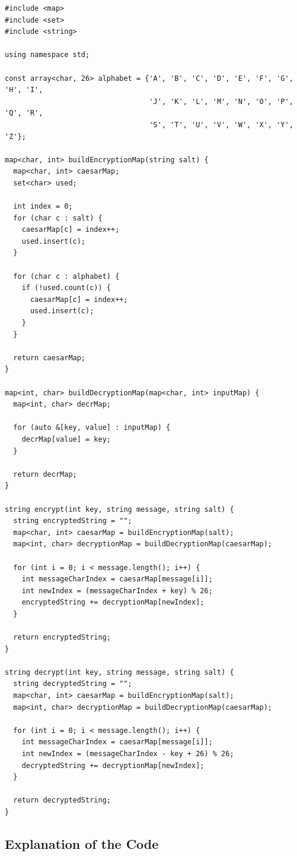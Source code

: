 \documentclass[12pt]{article}
\begin{document}
\begin{verbatim}
#include <map>
#include <set>
#include <string>

using namespace std;

const array<char, 26> alphabet = {'A', 'B', 'C', 'D', 'E', 'F', 'G', 'H', 'I',
                                  'J', 'K', 'L', 'M', 'N', 'O', 'P', 'Q', 'R',
                                  'S', 'T', 'U', 'V', 'W', 'X', 'Y', 'Z'};

map<char, int> buildEncryptionMap(string salt) {
  map<char, int> caesarMap;
  set<char> used;

  int index = 0;
  for (char c : salt) {
    caesarMap[c] = index++;
    used.insert(c);
  }

  for (char c : alphabet) {
    if (!used.count(c)) {
      caesarMap[c] = index++;
      used.insert(c);
    }
  }

  return caesarMap;
}

map<int, char> buildDecryptionMap(map<char, int> inputMap) {
  map<int, char> decrMap;

  for (auto &[key, value] : inputMap) {
    decrMap[value] = key;
  }

  return decrMap;
}

string encrypt(int key, string message, string salt) {
  string encryptedString = "";
  map<char, int> caesarMap = buildEncryptionMap(salt);
  map<int, char> decryptionMap = buildDecryptionMap(caesarMap);

  for (int i = 0; i < message.length(); i++) {
    int messageCharIndex = caesarMap[message[i]];
    int newIndex = (messageCharIndex + key) % 26;
    encryptedString += decryptionMap[newIndex];
  }

  return encryptedString;
}

string decrypt(int key, string message, string salt) {
  string decryptedString = "";
  map<char, int> caesarMap = buildEncryptionMap(salt);
  map<int, char> decryptionMap = buildDecryptionMap(caesarMap);

  for (int i = 0; i < message.length(); i++) {
    int messageCharIndex = caesarMap[message[i]];
    int newIndex = (messageCharIndex - key + 26) % 26;
    decryptedString += decryptionMap[newIndex];
  }

  return decryptedString;
}
\end{verbatim}

\subsection{Explanation of the Code}
\end{document}
